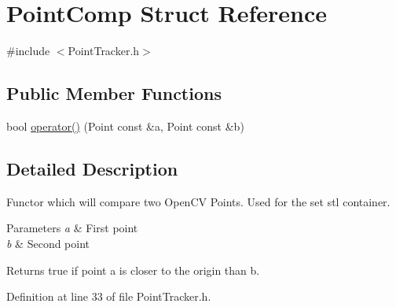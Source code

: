 \hypertarget{struct_point_comp}{
\section{\-Point\-Comp \-Struct \-Reference}
\label{struct_point_comp}
}


{\ttfamily \#include $<$\-Point\-Tracker.\-h$>$}

\subsection*{\-Public \-Member \-Functions}
\begin{DoxyCompactItemize}
\item 
bool \hyperlink{struct_point_comp_aa281978127904ee40fc4b1cb03730c24}{operator()} (\-Point const \&a, \-Point const \&b)
\end{DoxyCompactItemize}


\subsection{\-Detailed \-Description}
\-Functor which will compare two \-Open\-C\-V \-Points. \-Used for the set stl container. 
\begin{DoxyParams}{\-Parameters}
{\em a} & \-First point \\
\hline
{\em b} & \-Second point \\
\hline
\end{DoxyParams}
\begin{DoxyReturn}{\-Returns}
true if point a is closer to the origin than b. 
\end{DoxyReturn}


\-Definition at line 33 of file \-Point\-Tracker.\-h.



